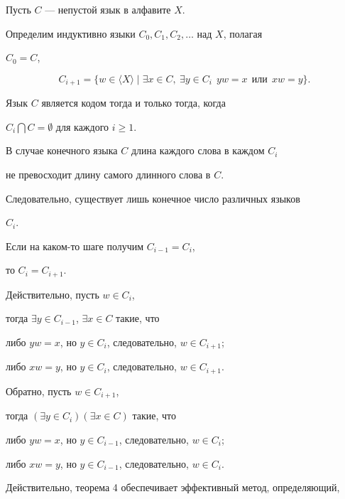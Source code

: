 \begin{thm}


Пусть $C$ --- непустой язык в алфавите $X$.


Определим индуктивно языки $C_{0},C_{1},C_{2},\dotsc$ над $X$, полагая


$C_{0}=C$,


$$


C_{i+1}=\lbrace w\in\langle X\rangle \mid


\exists x\in C, \ \exists y\in C_{i}


\ \ yw=x\ \ \text{или}\ \ xw=y\rbrace.


$$


Язык $C$ является кодом тогда и только тогда, когда


$C_{i}\bigcap C=\emptyset$ для каждого $i\geq 1$.


\end{thm}








В случае конечного языка $C$ длина каждого слова в каждом $C_{i}$


не превосходит длину самого длинного слова в $C$.


Следовательно, существует лишь конечное число различных языков


$C_{i}$.


Если на каком-то шаге получим $C_{i-1}=C_{i}$,


то $C_{i}=C_{i+1}$.


Действительно, пусть $w\in C_{i}$,


тогда $\exists y\in C_{i-1}$, $\exists x\in C$ такие, что


либо $yw=x$, но $y\in C_{i}$, следовательно, $w\in C_{i+1}$;


либо $xw=y$, но $y\in C_{i}$, следовательно, $w\in C_{i+1}$.


Обратно, пусть $w\in C_{i+1}$,


тогда $(\exists y\in C_{i}) (\exists x\in C)$ такие, что


либо $yw=x$, но $y\in C_{i-1}$, следовательно, $w\in C_{i}$;


либо $xw=y$, но $y\in C_{i-1}$, следовательно, $w\in C_{i}$.








Действительно, теорема 4 обеспечивает эффективный метод, определяющий,


